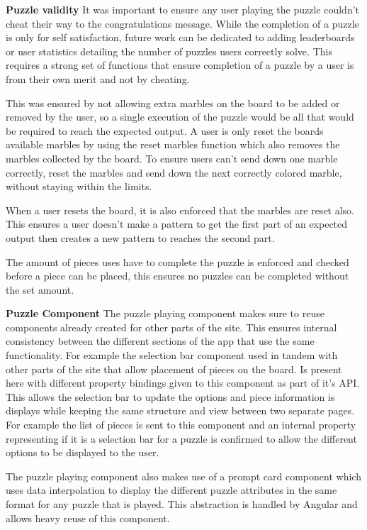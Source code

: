 \documentclass{l4proj}
\begin{document}
\textbf{Puzzle validity}
It was important to ensure any user playing the puzzle couldn't cheat their way to the congratulations message. While the completion of a puzzle is only for self satisfaction, future work can be dedicated to adding leaderboards or user statistics detailing the number of puzzles users correctly solve. This requires a strong set of functions that ensure completion of a puzzle by a user is from their own merit and not by cheating. 

This was ensured by not allowing extra marbles on the board to be added or removed by the user, so a single execution of the puzzle would be all that would be required to reach the expected output. A user is only reset the boards available marbles by using the reset marbles function which also removes the marbles collected by the board. To ensure users can't send down one marble correctly, reset the marbles and send down the next correctly colored marble, without staying within the limits.

When a user resets the board, it is also enforced that the marbles are reset also. This ensures a user doesn't make a pattern to get the first part of an expected output then creates a new pattern to reaches the second part.

The amount of pieces uses have to complete the puzzle is enforced and checked before a piece can be placed, this ensures no puzzles can be completed without the set amount. 

\textbf{Puzzle Component}
The puzzle playing component makes sure to reuse components already created for other parts of the site. This ensures internal consistency between the different sections of the app that use the same functionality. For example the selection bar component used in tandem with other parts of the site that allow placement of pieces on the board. Is present here with different property bindings given to this component as part of it's API. This allows the selection bar to update the options and piece information is displays while keeping the same structure and view between two separate pages. For example the list of pieces is sent to this component and an internal property representing if it is a selection bar for a puzzle is confirmed to allow the different options to be displayed to the user.

The puzzle playing component also makes use of a prompt card component which uses data interpolation to display the different puzzle attributes in the same format for any puzzle that is played. This abstraction is handled by Angular and allows heavy reuse of this component.
\end{document}
